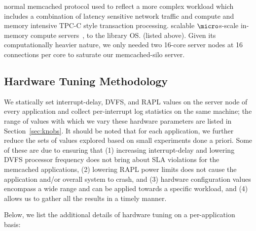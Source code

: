 \begin{itemize}
normal memcached protocol used to reflect a more complex workload which
includes a combination of latency sensitive network traffic and compute and
memory intensive TPC-C style transaction processing.
scalable $\micro$s-scale in-memory compute servers~\cite{zygos}, to the library
OS.
(listed above). Given its computationally heavier nature, we only needed two
16-core server nodes at 16 connections per core to saturate our memcached-silo
server.
\end{itemize}

\subsection{Hardware Tuning Methodology}
\label{sec:hw_tuning}
We statically set interrupt-delay, DVFS, and RAPL values on the server node of
every application and collect per-interrupt log statistics on the same machine;
the range of values with which we vary these hardware parameters are listed in
Section~\ref{sec:knobs}.
It should be noted that for each application, we further reduce the sets of
values explored based on small experiments done a priori. Some of these are due
to ensuring that (1) increasing interrupt-delay and lowering DVFS processor
frequency does not bring about SLA violations for the memcached applications,
(2) lowering RAPL power limits does not cause the application and/or overall
system to crash, and (3) hardware configuration values encompass a wide range
and can be applied towards a specific workload, and (4) allows us to gather all
the results in a timely manner.

Below, we list the additional details of hardware tuning on a per-application
basis:
     
